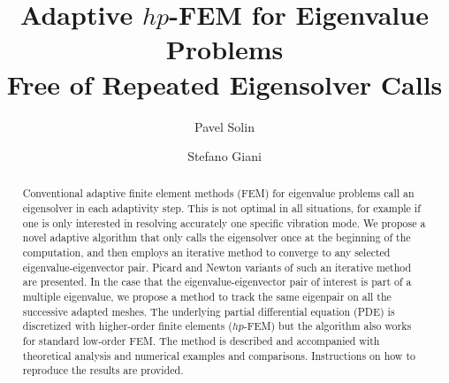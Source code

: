 \documentclass[preprint,12pt]{elsarticle}
\begin{document}
\begin{frontmatter}



\title{Adaptive $hp$-FEM for Eigenvalue Problems\\ Free of Repeated 
       Eigensolver Calls}

\author[label1,label2]{Pavel Solin}
\author[label3]{Stefano Giani}
\address[label1]{Department of Mathematics and Statistics, University of Nevada, Reno, USA}
\address[label2]{Institute of Thermomechanics, Academy of Sciences of the Czech Republic, Prague}
\address[label3]{School of Mathematical Sciences, University of Nottingham, United Kingdom}



\begin{abstract}

Conventional adaptive finite element methods (FEM) for eigenvalue problems call 
an eigensolver in each adaptivity step. This is not optimal in all situations, 
for example if one is only interested in resolving accurately one specific 
vibration mode. We propose a novel adaptive algorithm that only calls the 
eigensolver once at the beginning of the computation, and then employs an 
iterative method to converge to any selected eigenvalue-eigenvector pair. 
Picard and Newton variants of such an iterative method are presented. 
In the case that the eigenvalue-eigenvector pair of interest is part of a multiple eigenvalue,
we propose a method to track the same eigenpair on all the successive adapted meshes.
The 
underlying partial differential equation (PDE) is discretized with higher-order 
finite elements ($hp$-FEM) but the algorithm also works for standard 
low-order FEM. The method is described and accompanied with theoretical 
analysis and numerical examples and comparisons. Instructions on how to 
reproduce the results are provided. 
\end{abstract}


\end{frontmatter}
\end{document}
